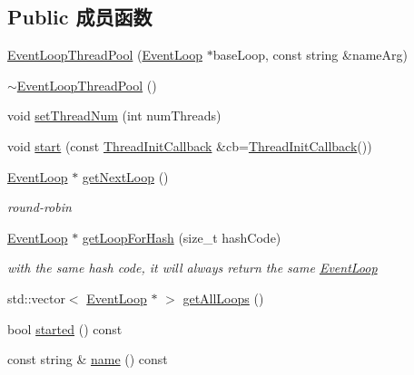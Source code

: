 \subsection*{Public 成员函数}
\begin{DoxyCompactItemize}
\item 
\hyperlink{classmuduo_1_1net_1_1EventLoopThreadPool_a2961d8892bd97371bfb49a0da492c97a}{Event\+Loop\+Thread\+Pool} (\hyperlink{classmuduo_1_1net_1_1EventLoop}{Event\+Loop} $\ast$base\+Loop, const string \&name\+Arg)
\item 
\hyperlink{classmuduo_1_1net_1_1EventLoopThreadPool_a009ff3f40b47ffa7ff8ed249e4be9864}{$\sim$\+Event\+Loop\+Thread\+Pool} ()
\item 
void \hyperlink{classmuduo_1_1net_1_1EventLoopThreadPool_a83bb28d139df96ba9fc449b4643f2c36}{set\+Thread\+Num} (int num\+Threads)
\item 
void \hyperlink{classmuduo_1_1net_1_1EventLoopThreadPool_a5fe387a4a4b327ac5ab2c563169cfdea}{start} (const \hyperlink{classmuduo_1_1net_1_1EventLoopThreadPool_a4665880f4633f1e7d95fd6fef6811717}{Thread\+Init\+Callback} \&cb=\hyperlink{classmuduo_1_1net_1_1EventLoopThreadPool_a4665880f4633f1e7d95fd6fef6811717}{Thread\+Init\+Callback}())
\item 
\hyperlink{classmuduo_1_1net_1_1EventLoop}{Event\+Loop} $\ast$ \hyperlink{classmuduo_1_1net_1_1EventLoopThreadPool_a32e25dd75cf32dae17aa6c8156ec1a89}{get\+Next\+Loop} ()
\begin{DoxyCompactList}\small\item\em round-\/robin \end{DoxyCompactList}\item 
\hyperlink{classmuduo_1_1net_1_1EventLoop}{Event\+Loop} $\ast$ \hyperlink{classmuduo_1_1net_1_1EventLoopThreadPool_a7aeeb1513af12dbff3370e780589fb3f}{get\+Loop\+For\+Hash} (size\+\_\+t hash\+Code)
\begin{DoxyCompactList}\small\item\em with the same hash code, it will always return the same \hyperlink{classmuduo_1_1net_1_1EventLoop}{Event\+Loop} \end{DoxyCompactList}\item 
std\+::vector$<$ \hyperlink{classmuduo_1_1net_1_1EventLoop}{Event\+Loop} $\ast$ $>$ \hyperlink{classmuduo_1_1net_1_1EventLoopThreadPool_a391f930ad84edb52bf75a36c9926b273}{get\+All\+Loops} ()
\item 
bool \hyperlink{classmuduo_1_1net_1_1EventLoopThreadPool_ae64a8595ddd43477f87ff91d9f051058}{started} () const
\item 
const string \& \hyperlink{classmuduo_1_1net_1_1EventLoopThreadPool_a47f4f0a66d5a539e687100dc65462ced}{name} () const
\end{DoxyCompactItemize}
